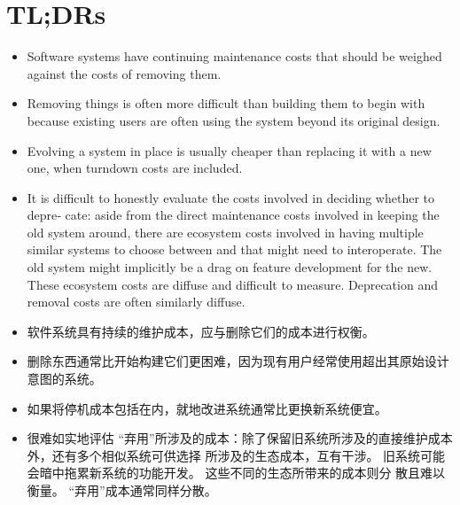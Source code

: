\documentclass[10pt,a4paper,UTF8]{ctexart}
\begin{document}
\section{TL;DRs}
\label{sec:orgff953cb}
\begin{itemize}
\item Software systems have continuing maintenance costs that should be weighed against the costs of removing them.
\item Removing things is often more difficult than building them to begin with because existing users are often using the system beyond its original design.
\item Evolving a system in place is usually cheaper than replacing it with a new one, when turndown costs are included.
\item It is difficult to honestly evaluate the costs involved in deciding whether to depre‐ cate: aside from the direct maintenance costs involved in keeping the old system around, there are ecosystem costs involved in having multiple similar systems to choose between and that might need to interoperate. The old system might implicitly be a drag on feature development for the new. These ecosystem costs are diffuse and difficult to measure. Deprecation and removal costs are often similarly diffuse.

\item 软件系统具有持续的维护成本，应与删除它们的成本进行权衡。
\item 删除东西通常比开始构建它们更困难，因为现有用户经常使用超出其原始设计意图的系统。
\item 如果将停机成本包括在内，就地改进系统通常比更换新系统便宜。
\item 很难如实地评估 “弃用”所涉及的成本：除了保留旧系统所涉及的直接维护成本外，还有多个相似系统可供选择
所涉及的生态成本，互有干涉。 旧系统可能会暗中拖累新系统的功能开发。 这些不同的生态所带来的成本则分
散且难以衡量。 “弃用”成本通常同样分散。
\end{itemize}
\end{document}
